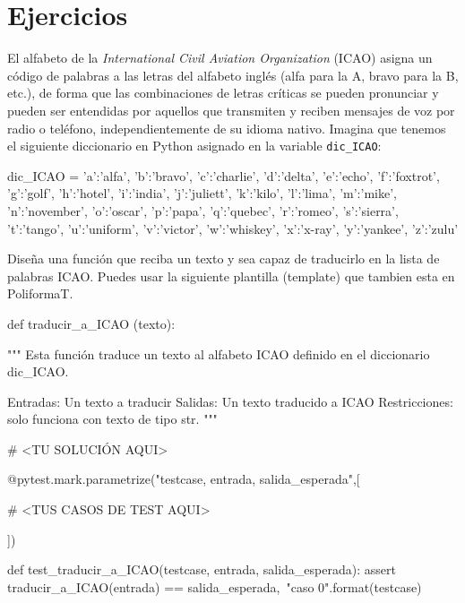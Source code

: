 
\section{Ejercicios}


\begin{exercise}
El alfabeto de la {\em International Civil Aviation Organization }(ICAO) asigna un código de palabras a las letras del alfabeto inglés (alfa para la A, bravo para la B, etc.), de forma que las combinaciones de letras críticas se pueden pronunciar y pueden ser entendidas por aquellos que transmiten y reciben mensajes de voz por radio o teléfono, independientemente de su idioma nativo. 
Imagina que tenemos el siguiente diccionario en Python asignado en la variable \texttt{dic\_ICAO}:

\begin{small}
\begin{python}
dic_ICAO = {
    'a':'alfa',
    'b':'bravo',
    'c':'charlie',
    'd':'delta',
    'e':'echo',
    'f':'foxtrot',
    'g':'golf',
    'h':'hotel',
    'i':'india',
    'j':'juliett',
    'k':'kilo',
    'l':'lima',
    'm':'mike',
    'n':'november',
    'o':'oscar',
    'p':'papa',
    'q':'quebec',
    'r':'romeo',
    's':'sierra',
    't':'tango',
    'u':'uniform',
    'v':'victor',
    'w':'whiskey',
    'x':'x-ray',
    'y':'yankee',
    'z':'zulu'
    }
\end{python}
\end{small}

Diseña una función que reciba un texto y sea capaz de traducirlo en la lista de palabras ICAO. Puedes usar la siguiente plantilla (template) que tambien esta en PoliformaT.

\begin{python}
def traducir_a_ICAO (texto):

    """
    Esta función traduce un texto al alfabeto ICAO definido en 
    el diccionario dic_ICAO.

    Entradas: Un texto a traducir
    Salidas:  Un texto traducido a ICAO
    Restricciones: solo funciona con texto de tipo str.
    """

#    <TU SOLUCIÓN AQUI>


@pytest.mark.parametrize("testcase, entrada, salida_esperada",[

#    <TUS CASOS DE TEST AQUI>
    
])

def test_traducir_a_ICAO(testcase, entrada, salida_esperada):
    assert traducir_a_ICAO(entrada) == salida_esperada,\
           "caso {0}".format(testcase)


\end{python}
\end{exercise}



